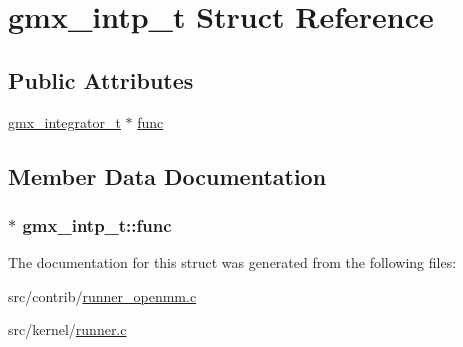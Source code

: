 \hypertarget{structgmx__intp__t}{\section{gmx\-\_\-intp\-\_\-t \-Struct \-Reference}
\label{structgmx__intp__t}
}
\subsection*{\-Public \-Attributes}
\begin{DoxyCompactItemize}
\item 
\hyperlink{share_2template_2gromacs_2mdrun_8h_ae5d9f1bdd5ff1d48316cc8a8a8381958}{gmx\-\_\-integrator\-\_\-t} $\ast$ \hyperlink{structgmx__intp__t_aaf54f2ae11203ff4df924830e9b5c632}{func}
\end{DoxyCompactItemize}


\subsection{\-Member \-Data \-Documentation}
\hypertarget{structgmx__intp__t_aaf54f2ae11203ff4df924830e9b5c632}{
\subsubsection[{func}]{ $\ast$ {\bf gmx\-\_\-intp\-\_\-t\-::func}}}\label{structgmx__intp__t_aaf54f2ae11203ff4df924830e9b5c632}


\-The documentation for this struct was generated from the following files\-:\begin{DoxyCompactItemize}
\item 
src/contrib/\hyperlink{runner__openmm_8c}{runner\-\_\-openmm.\-c}\item 
src/kernel/\hyperlink{runner_8c}{runner.\-c}\end{DoxyCompactItemize}
